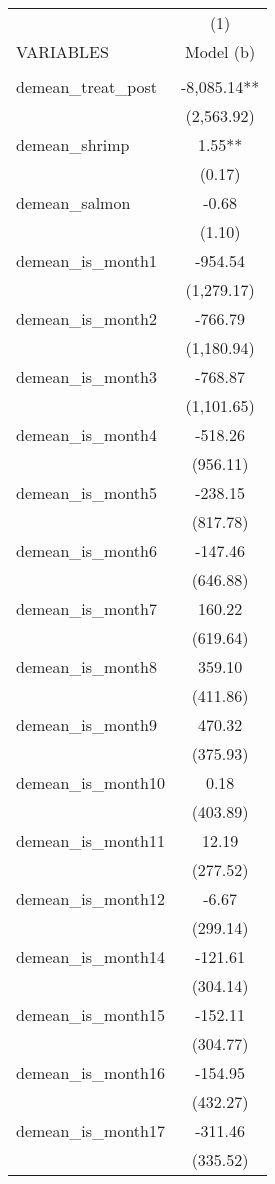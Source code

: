 \begin{tabular}{lc} \hline
 & (1) \\
VARIABLES & Model (b) \\ \hline
 &  \\
demean\_treat\_post & -8,085.14** \\
 & (2,563.92) \\
demean\_shrimp & 1.55** \\
 & (0.17) \\
demean\_salmon & -0.68 \\
 & (1.10) \\
demean\_is\_month1 & -954.54 \\
 & (1,279.17) \\
demean\_is\_month2 & -766.79 \\
 & (1,180.94) \\
demean\_is\_month3 & -768.87 \\
 & (1,101.65) \\
demean\_is\_month4 & -518.26 \\
 & (956.11) \\
demean\_is\_month5 & -238.15 \\
 & (817.78) \\
demean\_is\_month6 & -147.46 \\
 & (646.88) \\
demean\_is\_month7 & 160.22 \\
 & (619.64) \\
demean\_is\_month8 & 359.10 \\
 & (411.86) \\
demean\_is\_month9 & 470.32 \\
 & (375.93) \\
demean\_is\_month10 & 0.18 \\
 & (403.89) \\
demean\_is\_month11 & 12.19 \\
 & (277.52) \\
demean\_is\_month12 & -6.67 \\
 & (299.14) \\
demean\_is\_month14 & -121.61 \\
 & (304.14) \\
demean\_is\_month15 & -152.11 \\
 & (304.77) \\
demean\_is\_month16 & -154.95 \\
 & (432.27) \\
demean\_is\_month17 & -311.46 \\
 & (335.52) \\

\end{tabular}
